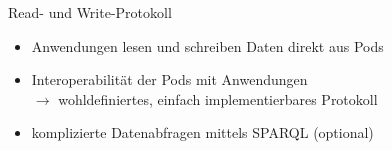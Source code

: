 




\begin{frame}{Read- und Write-Protokoll \footnotesize\cite{mecklerWebLinkedData2023,sambraSolidPlatformDecentralized2016}}
    \begin{itemize}
        \item Anwendungen lesen und schreiben Daten direkt aus Pods
        \item Interoperabilität der Pods mit Anwendungen\\ %
        $\to$ wohldefiniertes, einfach implementierbares Protokoll\\
        \item<3-> komplizierte Datenabfragen mittels SPARQL (optional)
    \end{itemize}
\end{frame}

